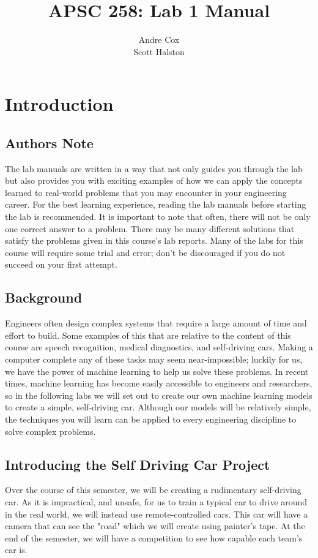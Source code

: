\documentclass[11pt]{report}
\title{APSC 258: Lab 1 Manual}
\author{Andre Cox \\ Scott Halston}
\begin{document}
    \maketitle
    \tableofcontents

    \clearpage

    \chapter{Introduction}

    \section{Authors Note}
    The lab manuals are written in a way that not only guides you through the lab but also provides you with exciting examples of how we can apply the concepts learned to real-world problems that you may encounter in your engineering career. For the best learning experience, reading the lab manuals before starting the lab is recommended.
    It is important to note that often, there will not be only one correct answer to a problem. There may be many different solutions that satisfy the problems given in this course's lab reports. Many of the labs for this course will require some trial and error; don't be discouraged if you do not succeed on your first attempt.


    \section{Background}
    Engineers often design complex systems that require a large amount of time and effort to build. Some examples of this that are relative to the content of this course are speech recognition, medical diagnostics, and self-driving cars.
    Making a computer complete any of these tasks may seem near-impossible; luckily for us, we have the power of machine learning to help us solve these problems. In recent times, machine learning has become easily accessible to engineers and researchers, so in the following labs we will set out to create our own machine learning models to create a simple, self-driving car.
    Although our models will be relatively simple, the techniques you will learn can be applied to every engineering discipline to solve complex problems.


    \section{Introducing the Self Driving Car Project}
    Over the course of this semester, we will be creating a rudimentary self-driving car. As it is impractical, and unsafe, for us to train a typical car to drive around in the real world, we will instead use remote-controlled cars. This car will have a camera that can see the "road" which we will create using painter's tape. At the end of the semester, we will have a competition to see how capable each team's car is.
\end{document}
